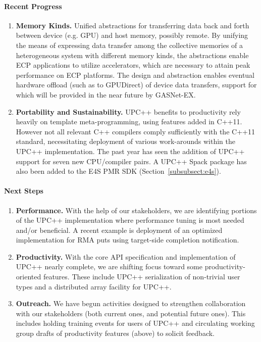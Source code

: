 \paragraph{Recent Progress}

\begin{enumerate}
\item \textbf{Memory Kinds.}
Unified abstractions for 
transferring data back and forth between device (e.g. GPU) and host memory, possibly remote.
By unifying the means of expressing data transfer among the collective memories of a heterogeneous system with different memory kinds,
the abstractions enable ECP applications to utilize accelerators, which are necessary to attain peak performance on ECP platforms.
The design and abstraction enables eventual hardware offload (such as to GPUDirect) of device data transfers, support for which will be provided in the near future by GASNet-EX.

\item \textbf{Portability and Sustainability.}
UPC++ benefits to productivity rely heavily on template meta-programming, using features added in C++11.
However not all relevant C++ compilers comply sufficiently with the C++11 standard, 
necessitating deployment of various work-arounds within the UPC++ implementation.
The past year has seen the addition of UPC++ support for seven new CPU/compiler pairs.
A UPC++ Spack package has also been added to the E4S PMR SDK (Section~\ref{subsubsect:e4s}).

\end{enumerate}

\paragraph{Next Steps}

\begin{enumerate}
\item \textbf{Performance.}
With the help of our stakeholders, we are identifying portions of the UPC++
implementation where performance tuning is most needed and/or beneficial.
A recent example is deployment of an optimized implementation for
RMA puts using target-side completion notification.

\item \textbf{Productivity.}
With the core API specification and implementation of UPC++ nearly complete, we
are shifting focus toward some productivity-oriented features.  These include
UPC++ serialization of non-trivial user types and a distributed array facility
for UPC++.

\item \textbf{Outreach.}
We have begun activities designed to strengthen collaboration with our
stakeholders (both current ones, and potential future ones).  This includes
holding training events for users of UPC++ and circulating working group
drafts of productivity features (above) to solicit feedback.

\end{enumerate}
